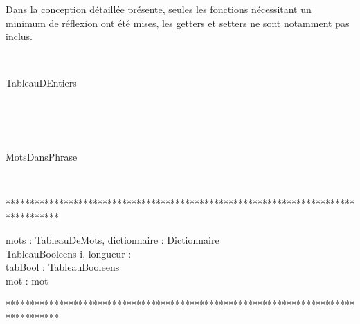 \par Dans la conception d\'etaill\'ee pr\'esente, seules les fonctions n\'ecessitant un minimum de r\'eflexion ont \'et\'e mises, les getters et setters ne sont notamment pas inclus.\\


\begin{algorithme}

\\

\begin{enregistrement}{TableauDEntiers}
\end{enregistrement}\\

\\

\\

\begin{enregistrement}{MotsDansPhrase}
\end{enregistrement}\\

\end{algorithme}

***********************************************************************************

\begin{algorithme}
%
	{mots : TableauDeMots, dictionnaire : Dictionnaire}%
	{\\TableauBooleens}%
	{i, longueur : \naturel \\ tabBool : TableauBooleens\\ mot : mot}%
	{%
	{	
		{
		}%
		{
			}
	}%
	}\\
\end{algorithme}
	
***********************************************************************************

